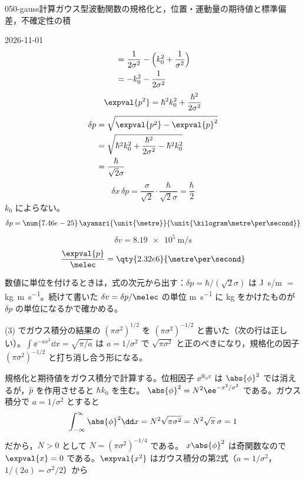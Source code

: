 \documentclass[uplatex,dvipdfmx,a4paper,11pt]{jsarticle}
\begin{document}
\begin{mondai}{050-gauss}{計算}{ガウス型波動関数の規格化と，位置・運動量の期待値と標準偏差，不確定性の積}
\begin{kotaeutsushi}{2026-11-01}
\begin{align*}
&=\frac{1}{2\sigma^{2}}-\Bigl(k_{0}^{2}+\frac{1}{\sigma^{2}}\Bigr)\\
&=-k_{0}^{2}-\frac{1}{2\sigma^{2}}
\end{align*}
\[ \expval{p^{2}}=\hbar^{2}k_{0}^{2}+\frac{\hbar^{2}}{2\sigma^{2}} \]
\begin{align*}
\delta p&=\sqrt{\expval{p^{2}}-\expval{p}^{2}}\\
&=\sqrt{\hbar^{2}k_{0}^{2}+\frac{\hbar^{2}}{2\sigma^{2}}-\hbar^{2}k_{0}^{2}}\\
&=\frac{\hbar}{\sqrt{2}\sigma}
\end{align*}
\[ \delta x\,\delta p=\frac{\sigma}{\sqrt{2}}\cdot\frac{\hbar}{\sqrt{2}\sigma}=\frac{\hbar}{2} \]
$k_{0}$ によらない。
\[ \delta p=\num{7.46e-25}\,\ayamari{\unit{\metre}}{\unit{\kilogram\metre\per\second}} \]
\[ \delta v=\qty{8.19e5}{\metre\per\second} \]
\[ \frac{\expval{p}}{\melec}=\qty{2.32e6}{\metre\per\second} \]
\end{kotaeutsushi}
\begin{kizuki}
\item 数値に単位を付けるときは，式の次元から出す：$\delta p=\hbar/(\sqrt{2}\sigma)$ は \unit{\joule\second}/\unit{\metre} $=$ \unit{\kilogram\metre\per\second}。続けて書いた $\delta v=\delta p/\melec$ の単位 \unit{\metre\per\second} に \unit{\kilogram} をかけたものが $\delta p$ の単位になるかで確かめる。
\item (3) でガウス積分の結果の $(\pi\sigma^{2})^{1/2}$ を $(\pi\sigma^{2})^{-1/2}$ と書いた（次の行は正しい）。$\int\ee^{-ax^{2}}\dd x=\sqrt{\pi/a}$ は $a=1/\sigma^{2}$ で $\sqrt{\pi\sigma^{2}}$ と正のべきになり，規格化の因子 $(\pi\sigma^{2})^{-1/2}$ と打ち消し合う形になる。
\end{kizuki}
\begin{tadashii}
\houshin 規格化と期待値をガウス積分で計算する。位相因子 $\ee^{\ii k_{0}x}$ は $\abs{\phi}^{2}$ では消えるが，$\hat{p}$ を作用させると $\hbar k_{0}$ を生む。
\keisan {} $\abs{\phi}^{2}=N^{2}\ee^{-x^{2}/\sigma^{2}}$ である。ガウス積分で $a=1/\sigma^{2}$ とすると
\[ \int_{-\infty}^{\infty}\abs{\phi}^{2}\dd x=N^{2}\sqrt{\pi\sigma^{2}}=N^{2}\sqrt{\pi}\,\sigma=1 \]
だから，$N>0$ として $N=(\pi\sigma^{2})^{-1/4}$ である。
 $x\abs{\phi}^{2}$ は奇関数なので $\expval{x}=0$ である。$\expval{x^{2}}$ はガウス積分の第2式（$a=1/\sigma^{2}$，$1/(2a)=\sigma^{2}/2$）から

\end{tadashii}
\end{mondai}
\end{document}
